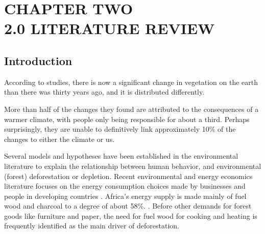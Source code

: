 
\chapter{CHAPTER TWO\\2.0 LITERATURE REVIEW} %

\label{Chapter2} %



\section{Introduction}
According to studies, there is now a significant change in vegetation on the earth than there was thirty years ago, and it is distributed differently.

More than half of the changes they found are attributed to the consequences of a warmer climate, with people only being responsible for about a third. Perhaps surprisingly, they are unable to definitively link approximately 10\% of the changes to either the climate or us.\parencite{alex2013climate}

Several models and hypotheses have been established in the environmental literature to explain the relationship between human behavior, and environmental (forest) deforestation or depletion. Recent environmental and energy economics literature focuses on the energy consumption
choices made by businesses and people in developing countries  \parencite{gertler2016demand}. Africa's energy supply
is made mainly of fuel wood and charcoal to a degree of about 58\%.\parencite{specht2015burning} . Before other
demands for forest goods like furniture and paper, the need for fuel wood for cooking and heating is frequently identified as the main driver
of deforestation.

